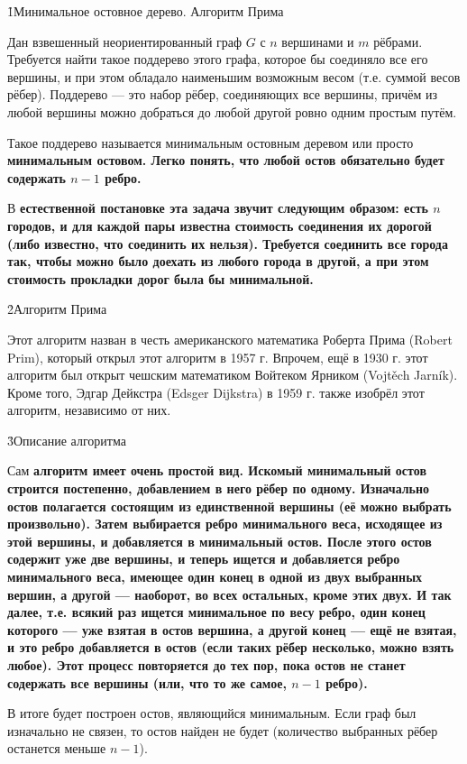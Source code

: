 \h1{Минимальное остовное дерево. Алгоритм Прима}

Дан взвешенный неориентированный граф $G$ с $n$ вершинами и $m$ рёбрами. Требуется найти такое поддерево этого графа, которое бы соединяло все его вершины, и при этом обладало наименьшим возможным весом (т.е. суммой весов рёбер). Поддерево --- это набор рёбер, соединяющих все вершины, причём из любой вершины можно добраться до любой другой ровно одним простым путём.

Такое поддерево называется минимальным остовным деревом или просто \bf{минимальным остовом}. Легко понять, что любой остов обязательно будет содержать $n-1$ ребро.

В \bf{естественной постановке} эта задача звучит следующим образом: есть $n$ городов, и для каждой пары известна стоимость соединения их дорогой (либо известно, что соединить их нельзя). Требуется соединить все города так, чтобы можно было доехать из любого города в другой, а при этом стоимость прокладки дорог была бы минимальной.


\h2{Алгоритм Прима}

Этот алгоритм назван в честь американского математика Роберта Прима (Robert Prim), который открыл этот алгоритм в 1957 г. Впрочем, ещё в 1930 г. этот алгоритм был открыт чешским математиком Войтеком Ярником (Vojtěch Jarník). Кроме того, Эдгар Дейкстра (Edsger Dijkstra) в 1959 г. также изобрёл этот алгоритм, независимо от них.


\h3{Описание алгоритма}

Сам \bf{алгоритм} имеет очень простой вид. Искомый минимальный остов строится постепенно, добавлением в него рёбер по одному. Изначально остов полагается состоящим из единственной вершины (её можно выбрать произвольно). Затем выбирается ребро минимального веса, исходящее из этой вершины, и добавляется в минимальный остов. После этого остов содержит уже две вершины, и теперь ищется и добавляется ребро минимального веса, имеющее один конец в одной из двух выбранных вершин, а другой --- наоборот, во всех остальных, кроме этих двух. И так далее, т.е. всякий раз ищется минимальное по весу ребро, один конец которого --- уже взятая в остов вершина, а другой конец --- ещё не взятая, и это ребро добавляется в остов (если таких рёбер несколько, можно взять любое). Этот процесс повторяется до тех пор, пока остов не станет содержать все вершины (или, что то же самое, $n-1$ ребро).

В итоге будет построен остов, являющийся минимальным. Если граф был изначально не связен, то остов найден не будет (количество выбранных рёбер останется меньше $n-1$).


